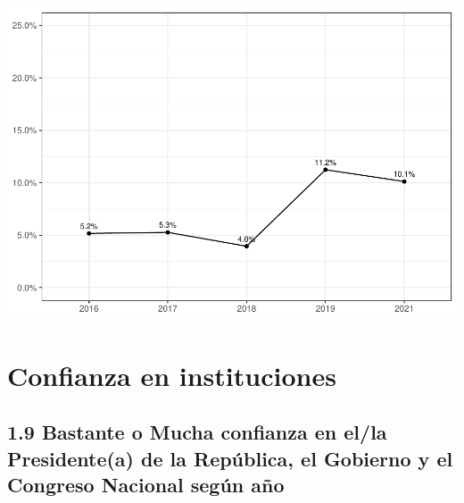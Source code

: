 \documentclass[
  12pt,
]{book}
\begin{document}
\includegraphics{reporte-elsoc_files/figure-latex/unnamed-chunk-13-1.pdf}

\hypertarget{confianza-en-instituciones}{%
\section{Confianza en instituciones}\label{confianza-en-instituciones}}

\hypertarget{bastante-o-mucha-confianza-en-ella-presidentea-de-la-repuxfablica-el-gobierno-y-el-congreso-nacional-seguxfan-auxf1o}{%
\subsection{1.9 Bastante o Mucha confianza en el/la Presidente(a) de la República, el Gobierno y el Congreso Nacional según año}\label{bastante-o-mucha-confianza-en-ella-presidentea-de-la-repuxfablica-el-gobierno-y-el-congreso-nacional-seguxfan-auxf1o}}
\end{document}
